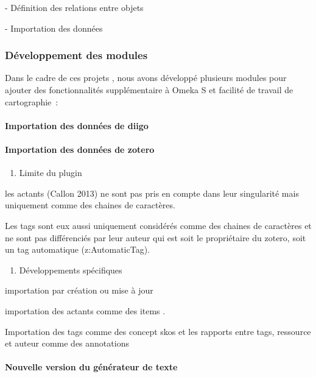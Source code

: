 \documentclass[
  a4paper,
  DIV=11,
  numbers=noendperiod]{scrreprt}
\let\oldparagraph\paragraph
\renewcommand{\paragraph}[1]{\oldparagraph{#1}\mbox{}}
\providecommand{\tightlist}{%
  \setlength{\itemsep}{0pt}\setlength{\parskip}{0pt}}\usepackage{longtable,booktabs,array}
\begin{document}
- Définition des relations entre objets

- Importation des données

\subsubsection{Développement des
modules}\label{duxe9veloppement-des-modules}

Dans le cadre de ces projets , nous avons développé plusieurs modules
pour ajouter des fonctionnalités supplémentaire à Omeka S et facilité de
travail de cartographie~:

\paragraph{Importation des données de diigo}\label{sec-importDiigo}

\paragraph{Importation des données de
zotero}\label{importation-des-donnuxe9es-de-zotero}

\begin{enumerate}
\def\labelenumi{\arabic{enumi}.}
\tightlist
\item
  Limite du plugin
\end{enumerate}

les actants (Callon 2013) ne sont pas pris en compte dans leur
singularité mais uniquement comme des chaines de caractères.

Les tags sont eux aussi uniquement considérés comme des chaines de
caractères et ne sont pas différenciés par leur auteur qui est soit le
propriétaire du zotero, soit un tag automatique (z:AutomaticTag).

\begin{enumerate}
\def\labelenumi{\arabic{enumi}.}
\tightlist
\item
  Développements spécifiques
\end{enumerate}

importation par création ou mise à jour

importation des actants comme des items .

Importation des tags comme des concept skos et les rapports entre tags,
ressource et auteur comme des annotations

\paragraph{Nouvelle version du générateur de
texte}\label{nouvelle-version-du-guxe9nuxe9rateur-de-texte}
\end{document}
